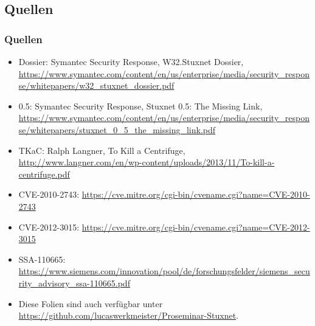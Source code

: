 \documentclass{beamer}
\begin{document}
\subsection{Quellen}

\begin{frame}
  \frametitle{Quellen}
  \fontsize{6pt}{7.2}\selectfont
  \begin{itemize}
    \item Dossier: Symantec Security Response, W32.Stuxnet Dossier, \url{https://www.symantec.com/content/en/us/enterprise/media/security_response/whitepapers/w32_stuxnet_dossier.pdf}
    \item 0.5: Symantec Security Response, Stuxnet 0.5: The Missing Link, \url{https://www.symantec.com/content/en/us/enterprise/media/security_response/whitepapers/stuxnet_0_5_the_missing_link.pdf}
    \item TKaC: Ralph Langner, To Kill a Centrifuge, \url{http://www.langner.com/en/wp-content/uploads/2013/11/To-kill-a-centrifuge.pdf}
    \item CVE-2010-2743: \url{https://cve.mitre.org/cgi-bin/cvename.cgi?name=CVE-2010-2743}
    \item CVE-2012-3015: \url{https://cve.mitre.org/cgi-bin/cvename.cgi?name=CVE-2012-3015}
    \item SSA-110665: \url{https://www.siemens.com/innovation/pool/de/forschungsfelder/siemens_security_advisory_ssa-110665.pdf}
    \item Diese Folien sind auch verfügbar unter \url{https://github.com/lucaswerkmeister/Proseminar-Stuxnet}.
  \end{itemize}
\end{frame}
\end{document}
